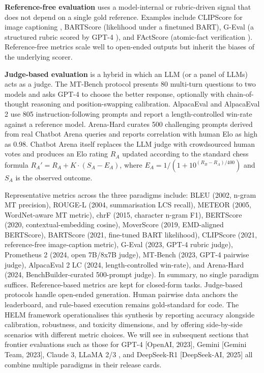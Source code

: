 \documentclass{article}
\begin{document}
\textbf{Reference-free evaluation} uses a model-internal or rubric-driven signal that does not depend on a single gold reference. Examples include CLIPScore for image captioning \cite{hessel20212021}, BARTScore (likelihood under a finetuned BART), G-Eval (a structured rubric scored by GPT-4 \cite{liu2023gevalnlgevaluation}), and FActScore (atomic-fact verification \cite{min2023factscorefinegrain,wei20242024}). Reference-free metrics scale well to open-ended outputs but inherit the biases of the underlying scorer.

\textbf{Judge-based evaluation} is a hybrid in which an LLM (or a panel of LLMs) acts as a judge. The MT-Bench protocol \cite{zheng20232023} presents 80 multi-turn questions to two models and asks GPT-4 to choose the better response, optionally with chain-of-thought reasoning and position-swapping calibration. AlpacaEval and AlpacaEval 2 use 805 instruction-following prompts and report a length-controlled win-rate against a reference model. Arena-Hard \cite{li20242024} curates 500 challenging prompts derived from real Chatbot Arena queries and reports correlation with human Elo as high as 0.98. Chatbot Arena itself \cite{chiang20242024} replaces the LLM judge with crowdsourced human votes and produces an Elo rating \(R_A\) updated according to the standard chess formula \(R_A' = R_A + K \cdot (S_A - E_A)\), where \(E_A = 1 / (1 + 10^{(R_B - R_A)/400})\) and \(S_A\) is the observed outcome.

Representative metrics across the three paradigms include: BLEU (2002, n-gram MT precision), ROUGE-L (2004, summarisation LCS recall), METEOR (2005, WordNet-aware MT metric), chrF (2015, character n-gram F1), BERTScore (2020, contextual-embedding cosine), MoverScore (2019, EMD-aligned BERTScore), BARTScore (2021, fine-tuned BART likelihood), CLIPScore (2021, reference-free image-caption metric), G-Eval (2023, GPT-4 rubric judge), Prometheus 2 (2024, open 7B/8x7B judge), MT-Bench (2023, GPT-4 pairwise judge), AlpacaEval 2 LC (2024, length-controlled win-rate), and Arena-Hard (2024, BenchBuilder-curated 500-prompt judge). In summary, no single paradigm suffices. Reference-based metrics are kept for closed-form tasks. Judge-based protocols handle open-ended generation. Human pairwise data anchors the leaderboard, and rule-based execution remains gold-standard for code. The HELM framework operationalises this synthesis by reporting accuracy alongside calibration, robustness, and toxicity dimensions, and by offering side-by-side scenarios with different metric choices. We will see in subsequent sections that frontier evaluations such as those for GPT-4 {[}OpenAI, 2023{]}, Gemini {[}Gemini Team, 2023{]}, Claude 3, LLaMA 2/3 \cite{touvron20232023}, and DeepSeek-R1 {[}DeepSeek-AI, 2025{]} all combine multiple paradigms in their release cards.
\end{document}

